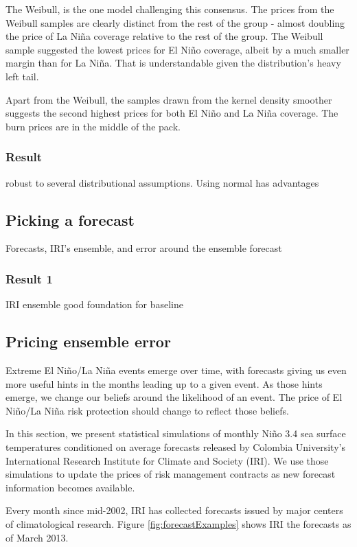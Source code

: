\documentclass[authoryear]{article}
\begin{document}
The Weibull, is the one model challenging this consensus. The prices from the Weibull samples are clearly distinct from the rest of the group - almost doubling the price of La Ni\~na coverage relative to the rest of the group. The Weibull sample suggested the lowest prices for El Ni\~no coverage, albeit by a much smaller margin than for La Ni\~na. That is understandable given the distribution's heavy left tail.

Apart from the Weibull, the samples drawn from the kernel density smoother suggests the second highest prices for both El Ni\~no and La Ni\~na coverage. The burn prices are in the middle of the pack.
\subsubsection{Result}
robust to several distributional assumptions. 
Using normal has advantages

\subsection{Picking a forecast}
Forecasts, IRI’s ensemble, and error around the ensemble forecast
\subsubsection{Result 1}
IRI ensemble good foundation for baseline

\subsection{Pricing ensemble error}

Extreme El Ni\~no/La Ni\~na events emerge over time, with forecasts giving us even more useful hints in the months leading up to a given event. As those hints emerge, we change our beliefs around the likelihood of an event. The price of El Ni\~no/La Ni\~na risk protection should change to reflect those beliefs.

In this section, we present statistical simulations of monthly Ni\~no 3.4 sea surface temperatures conditioned on average forecasts released by Colombia University's International Research Institute for Climate and Society (IRI). We use those simulations to update the prices of risk management contracts as new forecast information becomes available.

Every month since mid-2002, IRI has collected forecasts issued by major centers of climatological research. Figure \ref{fig:forecastExamples} shows IRI the forecasts as of March 2013.
\end{document}
